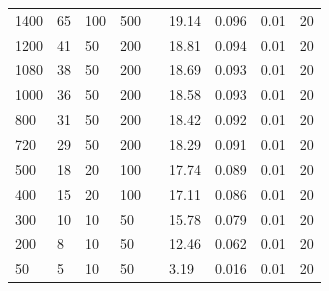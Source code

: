 \documentclass{article}
\begin{document}
\begin{longtable}[c]{|l|l|l|l|l|l|l|l|l|}
    1400          & 65                        & 100                       & 500                        &  & 19.14      & 0.096                      & 0.01                       & 20                         \\ \cline{1-4} \cline{6-9}
    1200          & 41                        & 50                        & 200                        &  & 18.81      & 0.094                      & 0.01                       & 20                         \\ \cline{1-4} \cline{6-9}
    1080          & 38                        & 50                        & 200                        &  & 18.69      & 0.093                      & 0.01                       & 20                         \\ \cline{1-4} \cline{6-9}
    1000          & 36                        & 50                        & 200                        &  & 18.58      & 0.093                      & 0.01                       & 20                         \\ \cline{1-4} \cline{6-9}
    800           & 31                        & 50                        & 200                        &  & 18.42      & 0.092                      & 0.01                       & 20                         \\ \cline{1-4} \cline{6-9}
    720           & 29                        & 50                        & 200                        &  & 18.29      & 0.091                      & 0.01                       & 20                         \\ \cline{1-4} \cline{6-9}
    500           & 18                        & 20                        & 100                        &  & 17.74      & 0.089                      & 0.01                       & 20                         \\ \cline{1-4} \cline{6-9}
    400           & 15                        & 20                        & 100                        &  & 17.11      & 0.086                      & 0.01                       & 20                         \\ \cline{1-4} \cline{6-9}
    300           & 10                        & 10                        & 50                         &  & 15.78      & 0.079                      & 0.01                       & 20                         \\ \cline{1-4} \cline{6-9}
    200           & 8                         & 10                        & 50                         &  & 12.46      & 0.062                      & 0.01                       & 20                         \\ \cline{1-4} \cline{6-9}
    50            & 5                         & 10                        & 50                         &  & 3.19       & 0.016                      & 0.01                       & 20                         \\ \cline{1-4} \cline{6-9}
    

\end{longtable}
\end{document}
